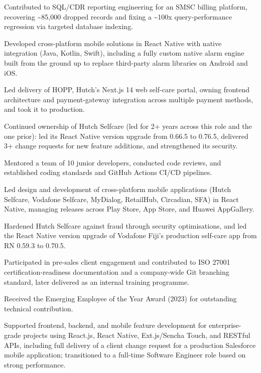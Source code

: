 \documentclass[10.5pt]{article}
\begin{document}
\begin{cvitems}
  \item Contributed to SQL/CDR reporting engineering for an SMSC billing platform, recovering \textasciitilde85,000 dropped records and fixing a \textasciitilde100x query-performance regression via targeted database indexing.
  \item Developed cross-platform mobile solutions in React Native with native integration (Java, Kotlin, Swift), including a fully custom native alarm engine built from the ground up to replace third-party alarm libraries on Android and iOS.
  \item Led delivery of HOPP, Hutch's Next.js 14 web self-care portal, owning frontend architecture and payment-gateway integration across multiple payment methods, and took it to production.
  \item Continued ownership of Hutch Selfcare (led for 2+ years across this role and the one prior): led its React Native version upgrade from 0.66.5 to 0.76.5, delivered 3+ change requests for new feature additions, and strengthened its security.
  \item Mentored a team of 10 junior developers, conducted code reviews, and established coding standards and GitHub Actions CI/CD pipelines.
\end{cvitems}

\begin{cvitems}
  \item Led design and development of cross-platform mobile applications (Hutch Selfcare, Vodafone Selfcare, MyDialog, RetailHub, Circadian, SFA) in React Native, managing releases across Play Store, App Store, and Huawei AppGallery.
  \item Hardened Hutch Selfcare against fraud through security optimisations, and led the React Native version upgrade of Vodafone Fiji's production self-care app from RN 0.59.3 to 0.70.5.
  \item Participated in pre-sales client engagement and contributed to ISO 27001 certification-readiness documentation and a company-wide Git branching standard, later delivered as an internal training programme.
  \item Received the Emerging Employee of the Year Award (2023) for outstanding technical contribution.
\end{cvitems}

\begin{cvitems}
  \item Supported frontend, backend, and mobile feature development for enterprise-grade projects using React.js, React Native, Ext.js/Sencha Touch, and RESTful APIs, including full delivery of a client change request for a production Salesforce mobile application; transitioned to a full-time Software Engineer role based on strong performance.
\end{cvitems}
\end{document}
